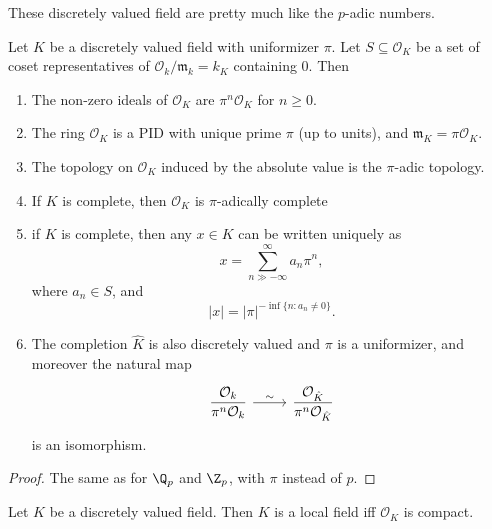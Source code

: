 \documentclass[a4paper]{article}
\begin{document}
These discretely valued field are pretty much like the $p$-adic numbers.
\begin{prop}
  Let $K$ be a discretely valued field with uniformizer $\pi$. Let $S \subseteq \mathcal{O}_K$ be a set of coset representatives of $\mathcal{O}_k/\mathfrak{m}_k = k_K$ containing $0$. Then
  \begin{enumerate}
    \item The non-zero ideals of $\mathcal{O}_K$ are $\pi^n \mathcal{O}_K$ for $n \geq 0$.
    \item The ring $\mathcal{O}_K$ is a PID with unique prime $\pi$ (up to units), and $\mathfrak{m}_K = \pi\mathcal{O}_K$.
    \item The topology on $\mathcal{O}_K$ induced by the absolute value is the $\pi$-adic topology.
    \item If $K$ is complete, then $\mathcal{O}_K$ is $\pi$-adically complete
    \item if $K$ is complete, then any $x \in K$ can be written uniquely as
      \[
        x = \sum_{n \gg -\infty}^\infty a_n \pi^n,
      \]
      where $a_n \in S$, and
      \[
        |x| = |\pi|^{-\inf\{n: a_n \not= 0\}}.
      \]
    \item The completion $\hat{K}$ is also discretely valued and $\pi$ is a uniformizer, and moreover the natural map
      \[
        \begin{tikzcd}
          \displaystyle\frac{\mathcal{O}_k}{\pi^n \mathcal{O}_k} \ar[r, "\sim"] & \displaystyle\frac{\mathcal{O}_{\hat{K}}}{\pi^n \mathcal{O}_{\hat{K}}}
        \end{tikzcd}
      \]
      is an isomorphism.
  \end{enumerate}
\end{prop}

\begin{proof}
  The same as for $\Q_p$ and $\Z_p$, with $\pi$ instead of $p$.
\end{proof}

\begin{prop}
  Let $K$ be a discretely valued field. Then $K$ is a local field iff $\mathcal{O}_K$ is compact.
\end{prop}
\end{document}
